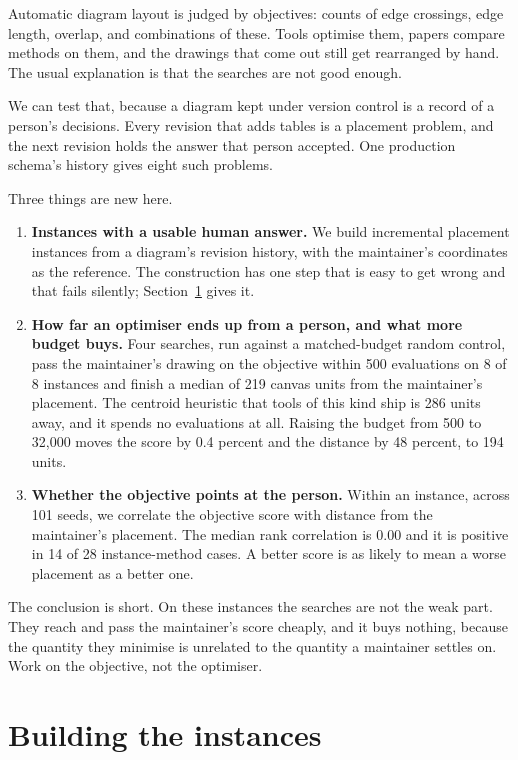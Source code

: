 \documentclass[11pt]{article}
\begin{document}
Automatic diagram layout is judged by objectives: counts of edge crossings, edge length,
overlap, and combinations of these. Tools optimise them, papers compare methods on them, and the
drawings that come out still get rearranged by hand. The usual explanation is that the searches
are not good enough.

We can test that, because a diagram kept under version control is a record of a person's
decisions. Every revision that adds tables is a placement problem, and the next revision holds
the answer that person accepted. One production schema's history gives eight such problems.

Three things are new here.

\begin{enumerate}
\item \textbf{Instances with a usable human answer.} We build incremental placement instances
from a diagram's revision history, with the maintainer's coordinates as the reference. The
construction has one step that is easy to get wrong and that fails silently;
Section~\ref{sec:build} gives it.
\item \textbf{How far an optimiser ends up from a person, and what more budget buys.} Four
searches, run against a matched-budget random control, pass the maintainer's drawing on the
objective within 500 evaluations on 8 of 8 instances and finish a median of 219 canvas units
from the maintainer's placement. The centroid heuristic that tools of this kind ship is 286
units away, and it spends no evaluations at all. Raising the budget from 500 to 32{,}000 moves
the score by 0.4 percent and the distance by 48 percent, to 194 units.
\item \textbf{Whether the objective points at the person.} Within an instance, across 101 seeds,
we correlate the objective score with distance from the maintainer's placement. The median rank
correlation is $0.00$ and it is positive in 14 of 28 instance-method cases. A better score is as
likely to mean a worse placement as a better one.
\end{enumerate}

The conclusion is short. On these instances the searches are not the weak part. They reach and
pass the maintainer's score cheaply, and it buys nothing, because the quantity they minimise is
unrelated to the quantity a maintainer settles on. Work on the objective, not the optimiser.

\section{Building the instances}\label{sec:build}
\end{document}

